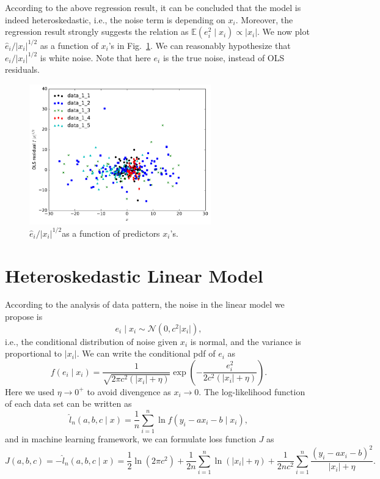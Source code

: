 \documentclass{revtex4}
\begin{document}
According to the above regression result, it can be concluded that the model is indeed
heteroskedastic, i.e., the noise term is depending on $x_i$.  Moreover, the regression result
strongly suggests the relation as $\mathbb{E}\left(e^2_i\mid x_i\right)\propto\left|x_i\right|$.
We now plot $\widehat{e}_i/\left|x_i\right|^{1/2}$ as a function of $x_i$'s in Fig.~\ref{fig:pattern}.
We can reasonably hypothesize that $e_i/\left|x_i\right|^{1/2}$ is white noise. Note that here
$e_i$ is the true noise, instead of OLS residuals.
\begin{figure}[!ht]
  \centering
  \includegraphics[width=0.7\textwidth]{peek_pattern}
  \caption{$\widehat{e}_i/\left|x_i\right|^{1/2}$as a function of predictors $x_i$'s.}
  \label{fig:pattern}
\end{figure}

\section{Heteroskedastic Linear Model}

According to the analysis of data pattern, the noise in the linear model we propose is
\begin{equation}
  e_i \mid x_i \sim \mathcal{N}\left(0,c^2\left|x_i\right|\right),
\end{equation}
i.e., the conditional distribution of noise given $x_i$ is normal, and the variance
is proportional to $\left|x_i\right|$.  We can write the conditional pdf of $e_i$ as
\begin{equation}
  f\left(e_i\mid x_i\right) = \frac{1}{\sqrt{2\pi c^2\left(\left|x_i\right|+\eta\right)}}
  \exp\left(-\frac{e^2_i}{2c^2\left(\left|x_i\right|+\eta\right)}\right).
\end{equation}
Here we used $\eta\to0^{+}$ to avoid divengence as $x_i\to0$.  The log-likelihood function
of each data set can be written as
\begin{equation}
  \widehat{l}_n\left(a,b,c\mid x\right) =
  \frac{1}{n}\sum^n_{i=1}\ln f\left(y_i-ax_i-b\mid x_i\right),
\end{equation}
and in machine learning framework, we can formulate loss function $J$ as
\begin{equation}
  J\left(a,b,c\right) = -\widehat{l}_n\left(a,b,c\mid x\right) =
  \frac{1}{2}\ln\left(2\pi c^2\right) +
  \frac{1}{2n}\sum^n_{i=1}\ln\left(\left|x_i\right|+\eta\right) +
  \frac{1}{2nc^2}\sum^n_{i=1}\frac{\left(y_i-ax_i-b\right)^2}{\left|x_i\right|+\eta}.
\end{equation}
\end{document}

